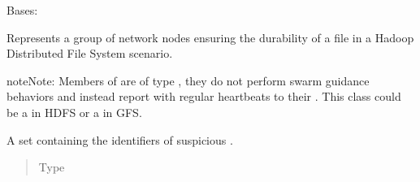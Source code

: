 \documentclass[letterpaper,10pt,english]{sphinxmanual}
\begin{document}
\begin{fulllineitems}
\label{\detokenize{app.domain:app.domain.cluster_groups.HDFSCluster}}
Bases: {\hyperref[\detokenize{app.domain:app.domain.cluster_groups.Cluster}]{}}

Represents a group of network nodes ensuring the durability of a file
in a Hadoop Distributed File System scenario.

\begin{sphinxadmonition}{note}{Note:}
Members of  are of type
{\hyperref[\detokenize{app.domain:app.domain.network_nodes.HDFSNode}]{}}, they do not
perform swarm guidance behaviors and instead report with regular
heartbeats to their {\hyperref[\detokenize{app.domain:app.domain.cluster_groups.HDFSCluster}]{}}. This class could be a
 in HDFS or a  in GFS.
\end{sphinxadmonition}

\begin{fulllineitems}
\label{\detokenize{app.domain:app.domain.cluster_groups.HDFSCluster.suspicious_nodes}}
A set containing the identifiers of suspicious
{\hyperref[\detokenize{app.domain:app.domain.network_nodes.HDFSNode}]{}}.
\begin{quote}\begin{description}
\item[{Type}] \leavevmode
{}

\end{description}\end{quote}

\end{fulllineitems}


\end{fulllineitems}
\end{document}
